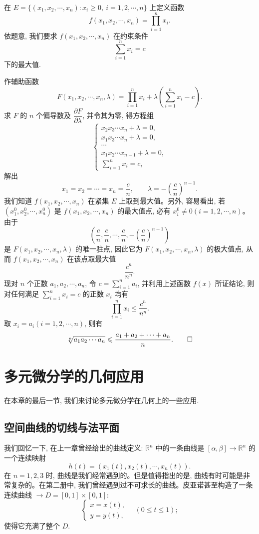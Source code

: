 \begin{solve}
在 $E=\{(x_1,x_2,\cdots,x_n):x_i\geqslant0,\ i=1,2,\cdots,n\}$ 上定义函数
\[
  f(x_1,x_2,\cdots,x_n)=\prod_{i=1}^n x_i.
\]
依题意, 我们要求 $f(x_1,x_2,\cdots,x_n)$ 在约束条件
\[
  \sum_{i=1}^n x_i=c
\]
下的最大值.

作辅助函数
\[
  F(x_1,x_2,\cdots,x_n,\lambda)
  =
  \prod_{i=1}^n x_i
  +\lambda\left(\sum_{i=1}^n x_i-c\right).
\]
求 $F$ 的 $n$ 个偏导数及 $\dfrac{\partial F}{\partial\lambda}$, 并令其为零, 得方程组
\[
  \begin{cases}
    x_2x_3\cdots x_n+\lambda=0,\\
    x_1x_3\cdots x_n+\lambda=0,\\
    \cdots\\
    x_1x_2\cdots x_{n-1}+\lambda=0,\\
    \displaystyle\sum_{i=1}^n x_i=c,
  \end{cases}
\]
解出
\[
  x_1=x_2=\cdots=x_n=\frac cn,\qquad
  \lambda=-\left(\frac cn\right)^{n-1}.
\]
我们知道 $f(x_1,x_2,\cdots,x_n)$ 在紧集 $E$ 上取到最大值。另外, 容易看出, 若 $(x_1^0,x_2^0,\cdots,x_n^0)$ 是 $f(x_1,x_2,\cdots,x_n)$ 的最大值点, 必有 $x_i^0\ne0(i=1,2,\cdots,n)$。由于
\[
  \left(\frac cn,\frac cn,\cdots,\frac cn,-\left(\frac cn\right)^{n-1}\right)
\]
是 $F(x_1,x_2,\cdots,x_n,\lambda)$ 的唯一驻点, 因此它为 $F(x_1,x_2,\cdots,x_n,\lambda)$ 的极大值点, 从而 $f(x_1,x_2,\cdots,x_n)$ 在该点取最大值
\[
  \frac{c^n}{n^n}.
\]
现对 $n$ 个正数 $a_1,a_2,\cdots,a_n$, 令 $c=\displaystyle\sum_{i=1}^n a_i$, 并利用上述函数 $f(x)$ 所证结论, 则对任何满足 $\displaystyle\sum_{i=1}^n x_i=c$ 的正数 $x_i$ 均有
\[
  \prod_{i=1}^n x_i\leqslant\frac{c^n}{n^n}.
\]
取 $x_i=a_i(i=1,2,\cdots,n)$, 则有
\[
  \sqrt[n]{a_1a_2\cdots a_n}
  \leqslant
  \frac{a_1+a_2+\cdots+a_n}{n}.
\qedhere
\]
\end{solve}


\section{多元微分学的几何应用}
\label{sec:ma-14-6}

在本章的最后一节, 我们来讨论多元微分学在几何上的一些应用.

\subsection{空间曲线的切线与法平面}
\label{subsec:ma-14-6-1}

我们回忆一下, 在上一章曾经给出的曲线定义: $\mathbb R^n$ 中的一条曲线是 $[\alpha,\beta]\to\mathbb R^n$ 的一个连续映射
\[
  h(t)=(x_1(t),x_2(t),\cdots,x_n(t)).
\]
在 $n=1,2,3$ 时, 曲线是我们经常遇到的。但是值得指出的是, 曲线有时可能是非常复杂的。在第二册中, 我们曾经遇到过不可求长的曲线。皮亚诺甚至构造了一条连续曲线 $\to D=[0,1]\times[0,1]$:
\[
  \begin{cases}
    x=x(t),\\
    y=y(t),
  \end{cases}
  \quad (0\leqslant t\leqslant1);
\]
使得它充满了整个 $D$.


